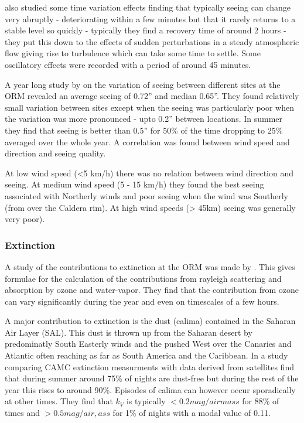 \cite{munoz97nighttime} also studied some time variation effects finding that typically seeing can change very abruptly - deteriorating within a few minutes but that it rarely returns to a stable level so quickly - typically they find a recovery time of around 2 hours - they put this down to the effects of sudden perturbations in a steady atmospheric flow giving rise to turbulence which can take some time to settle. Some oscillatory effects were recorded with a period of around 45 minutes. 

A year long study by \cite{munoz98homogeneity} on the variation of seeing between different sites at the ORM revealed an average seeing of 0.72'' and median 0.65''. They found relatively small variation between sites except when the seeing was particularly poor when the variation was more pronounced - upto 0.2'' between locations. In summer they find that seeing is better than 0.5'' for 50\% of the time dropping to 25\% averaged over the whole year. A correlation was found between wind speed and direction and seeing quality. 

At low wind speed (<5 km/h) there was no relation between wind direction and seeing. At medium wind speed (5 - 15 km/h) they found the best seeing associated with Northerly winds and poor seeing when the wind was Southerly (from over the Caldera rim). At high wind speeds (> 45km) seeing was generally very poor). 

\subsubsection{Extinction}
A study of the contributions to extinction at the ORM was made by \cite{lapalma31}. This gives formulae for the calculation of the contributions from rayleigh scattering and absorption by ozone and water-vapor. They find that the contribution from ozone can vary significantly during the year and even on timescales of a few hours.

A major contribution to extinction is the dust (calima) contained in the Saharan Air Layer (SAL). This dust is thrown up from the Saharan desert by predominatly South Easterly winds and the pushed West over the Canaries and Atlantic often reaching as far as South America and the Caribbean. In a study comparing CAMC extinction measurments with data derived from satellites \cite{varelo07sat} find that during summer around 75\% of nights are dust-free but during the rest of the year this rises to around 90\%. Episodes of calima can however occur sporadically at other times. They find that $k_V$ is typically $< 0.2 mag/airmass$ for 88\% of times and $> 0.5 mag/air,ass$ for 1\% of nights with a modal value of 0.11.

